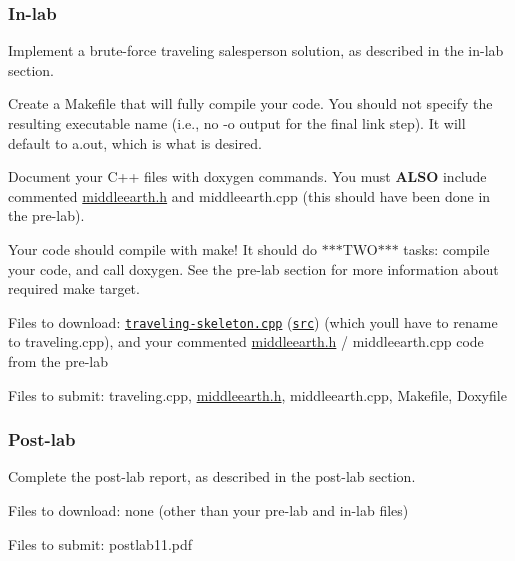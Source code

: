 \subsubsection*{In-\/lab}


\begin{DoxyEnumerate}
\item Implement a brute-\/force traveling salesperson solution, as described in the in-\/lab section.
\item Create a Makefile that will fully compile your code. You should not specify the resulting executable name (i.\+e., no {\ttfamily -\/o} output for the final link step). It will default to a.\+out, which is what is desired.
\item Document your C++ files with doxygen commands. You must {\bfseries A\+L\+SO} include commented \hyperlink{middleearth_8h_source}{middleearth.\+h} and middleearth.\+cpp (this should have been done in the pre-\/lab).
\item Your code should compile with {\ttfamily make}! It should do $\ast$$\ast$$\ast$\+T\+W\+O$\ast$$\ast$$\ast$ tasks\+: compile your code, and call {\ttfamily doxygen}. See the pre-\/lab section for more information about required make target.
\item Files to download\+: \href{traveling-skeleton.cpp.html}{\tt traveling-\/skeleton.\+cpp} (\href{traveling-skeleton.cpp}{\tt src}) (which you\textquotesingle{}ll have to rename to traveling.\+cpp), and your commented \hyperlink{middleearth_8h_source}{middleearth.\+h} / middleearth.\+cpp code from the pre-\/lab
\item Files to submit\+: traveling.\+cpp, \hyperlink{middleearth_8h_source}{middleearth.\+h}, middleearth.\+cpp, Makefile, Doxyfile
\end{DoxyEnumerate}

\subsubsection*{Post-\/lab}


\begin{DoxyEnumerate}
\item Complete the post-\/lab report, as described in the post-\/lab section.
\item Files to download\+: none (other than your pre-\/lab and in-\/lab files)
\item Files to submit\+: postlab11.\+pdf 


\end{DoxyEnumerate}

